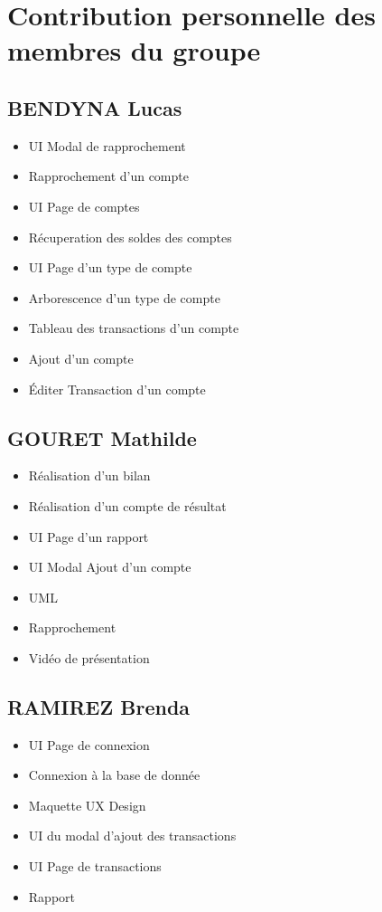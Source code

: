 \documentclass[10pt,a4paper,openany]{report}
\begin{document}
	
	\section{Contribution personnelle des membres du groupe}

	\subsection{BENDYNA Lucas}
	\begin{itemize}
		\item UI Modal de rapprochement
		\item Rapprochement d'un compte
		\item UI Page de comptes
		\item Récuperation des soldes des comptes
		\item UI Page d'un type de compte
		\item Arborescence d'un type de compte
		\item Tableau des transactions d'un compte
		\item Ajout d'un compte
		\item Éditer Transaction d'un compte
	\end{itemize}
	\subsection{GOURET Mathilde}
	\begin{itemize}
		\item Réalisation d'un bilan
		\item Réalisation d'un compte de résultat
		\item UI Page d'un rapport
		\item UI Modal Ajout d'un compte
		\item UML 
		\item Rapprochement
		\item Vidéo de présentation	
	\end{itemize}
	\subsection{RAMIREZ Brenda}
	\begin{itemize}
		\item UI Page de connexion
		\item Connexion à la base de donnée
		\item Maquette UX Design
		\item UI du modal d'ajout des transactions
		\item UI Page de transactions
		\item Rapport
	\end{itemize}
\end{document}

